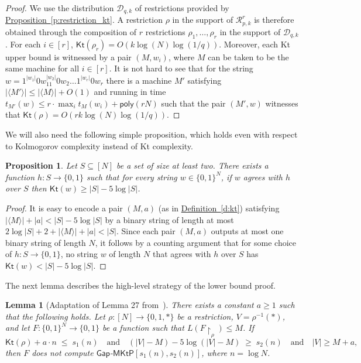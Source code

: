 \documentclass[11pt]{article}
\numberwithin{equation}{section}
\newtheorem{lemma}[theorem]{Lemma}
\newtheorem{proposition}[theorem]{Proposition}
\theoremstyle{definition}
\theoremstyle{plain}
\newcommand{\expref}[2]{\hyperref[#2]{#1~\ref{#2}}}
\newcommand{\gapmktp}{\mathsf{Gap}$-$\mathsf{MKtP}}
\newcommand{\Kt}{\mathsf{Kt}}
\begin{document}
\begin{proof}
We use the distribution $\mathcal{D}_{q,k}$ of restrictions provided by \expref{Proposition}{p:restriction_kt}.  A restriction $\rho$ in the support of $\mathcal{R}^r_{p,k}$ is therefore obtained through the composition of $r$ restrictions $\rho_1, \ldots, \rho_r$ in the support of $\mathcal{D}_{q,k}$. For each $i \in [r]$, $\Kt(\rho_r) = O(k \log (N) \log (1/q))$. Moreover, each Kt upper bound is witnessed by a pair $(M,w_{i})$, where $M$ can be taken to be the same machine for all $i \in [r]$. It is not hard to see that for the string $w = 1^{|w_1|}0w_11^{|w_2|}0w_2 \ldots 1^{|w_r|}0w_r$ there is a machine $M'$ satisfying $|\langle M' \rangle | \leq |\langle M \rangle| + O(1)$ and running in time $t_{M'}(w) \leq r \cdot \max_{i} t_{M}(w_i) + \mathsf{poly}(rN)$ such that the pair $(M',w)$ witnesses that $\Kt(\rho) = O(r k \log (N) \log (1/q))$.
\end{proof}

We will also need the following simple proposition, which holds even with respect to Kolmogorov complexity instead of Kt complexity.



\begin{proposition}\label{p:hard_function}
Let $S \subseteq [N]$ be a set of size at least two. There exists a function $h \colon S \to \{0,1\}$ such that for every string $w \in \{0,1\}^N$, if $w$ agrees with $h$ over $S$ then $\Kt(w) \geq |S| - 5\log |S|$.
\end{proposition}

\begin{proof}
It is easy to encode a pair $(M,a)$ (as in \expref{Definition}{d:kt}) satisfying $|\langle M \rangle | + |a| < |S| - 5 \log |S|$ by a binary string of length at most $2\log |S| + 2 + |\langle M \rangle | + |a| < |S|$. Since each pair $(M,a)$ outputs at most one binary string of length $N$, it follows by a counting argument that for some choice of $h \colon S \to \{0,1\}$, no string $w$ of length $N$ that agrees with $h$ over $S$ has $\Kt(w) < |S| - 5 \log |S|$.
\end{proof}

The next lemma describes the high-level strategy of the lower bound proof.

\begin{lemma}[Adaptation of Lemma 27 from~\cite{DBLP:conf/coco/HiraharaS17}]\label{l:doesnotcomputeMCSP}
There exists a constant $a \geq 1$ such that the following holds. Let $\rho \colon [N] \to \{0,1,*\}$ be a restriction, $V = \rho^{-1}(*)$, and let $F \colon \{0,1\}^N \to \{0,1\}$ be a function such that $L(F\!\upharpoonright_\rho) \leq M$. If
$$
\Kt(\rho) + a\cdot n \;\leq\; s_1(n) \quad \text{and} \quad (|V| - M) - 5 \log(|V| - M) \;\geq\; s_2(n) \quad \text{and} \quad |V| \geq M + a,
$$
then $F$ does not compute $\gapmktp[s_1(n), s_2(n)]$, where $n = \log N$.
\end{lemma}
\end{document}
